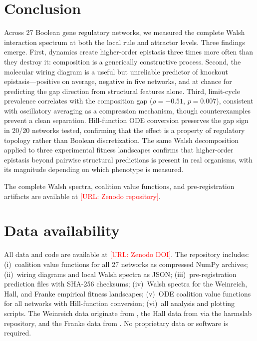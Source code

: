 \documentclass[10pt]{article}
\begin{document}
\section{Conclusion}
\label{sec:conclusion}

Across 27 Boolean gene regulatory networks, we measured the complete
Walsh interaction spectrum at both the local rule and attractor
levels. Three findings emerge. First, dynamics create higher-order
epistasis three times more often than they destroy it: composition
is a generically constructive process. Second, the molecular wiring
diagram is a useful but unreliable predictor of knockout
epistasis---positive on average, negative in five networks, and at
chance for predicting the gap direction from structural features
alone. Third, limit-cycle prevalence correlates with the composition
gap ($\rho = -0.51$, $p = 0.007$), consistent with oscillatory
averaging as a compression mechanism, though counterexamples prevent
a clean separation. Hill-function ODE conversion preserves the gap
sign in 20/20 networks tested, confirming that the effect is a
property of regulatory topology rather than Boolean discretization.
The same Walsh decomposition applied to three experimental fitness
landscapes confirms that higher-order epistasis beyond pairwise
structural predictions is present in real organisms, with its
magnitude depending on which phenotype is measured.

The complete Walsh spectra, coalition value functions, and
pre-registration artifacts are available at
\textcolor{red}{[URL: Zenodo repository]}.


\section*{Data availability}

All data and code are available at \textcolor{red}{[URL: Zenodo DOI]}.
The repository includes: (i)~coalition value functions for all 27
networks as compressed NumPy archives; (ii)~wiring diagrams and local
Walsh spectra as JSON; (iii)~pre-registration prediction files with
SHA-256 checksums; (iv)~Walsh spectra for the Weinreich, Hall, and Franke
empirical fitness landscapes; (v)~ODE coalition value functions for
all networks with Hill-function conversion; (vi)~all analysis and
plotting scripts.
The Weinreich data originate from \citet{weinreich2006darwinian},
the Hall data from \citet{hall2010fitness} via the harmslab
repository, and the Franke data from \citet{franke2011evolutionary}.
No proprietary data or software is required.
\end{document}
